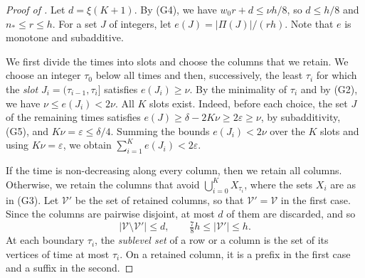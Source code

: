 \documentclass[fontsize=12pt,leading=14pt]{fullpaper}
\newcommand{\Vcal}{\mathcal{V}}
\newcommand{\eps}{\varepsilon}
\begin{document}
\begin{proof}[Proof of ]
  Let $d=\xi(K+1)$.
  By (G4), we have $w_0r+d\le\nu h/8$, so $d\le h/8$ and $n_*\le r\le h$.
  For a set $J$ of integers, let $e(J)=|\Pi(J)|/(rh)$.
  Note that $e$ is monotone and subadditive.

  We first divide the times into slots and choose the columns that we retain.
  We choose an integer $\tau_0$ below all times and then, successively, the least $\tau_i$ for which the \emph{slot} $J_i=(\tau_{i-1},\tau_i]$ satisfies $e(J_i)\ge\nu$.
  By the minimality of $\tau_i$ and by (G2), we have $\nu\le e(J_i)<2\nu$.
  All $K$ slots exist.
  Indeed, before each choice, the set $J$ of the remaining times satisfies $e(J)\ge\delta-2K\nu\ge2\eps\ge\nu$, by subadditivity, (G5), and $K\nu=\eps\le\delta/4$.
  Summing the bounds $e(J_i)<2\nu$ over the $K$ slots and using $K\nu=\eps$, we obtain $\sum_{i=1}^K e(J_i)<2\eps$.

  If the time is non-decreasing along every column, then we retain all columns.
  Otherwise, we retain the columns that avoid $\bigcup_{i=0}^K X_{\tau_i}$, where the sets $X_i$ are as in (G3).
  Let $\Vcal'$ be the set of retained columns, so that $\Vcal'=\Vcal$ in the first case.
  Since the columns are pairwise disjoint, at most $d$ of them are discarded, and so
  \[
    |\Vcal\setminus\Vcal'|\le d,\qquad \tfrac78h\le|\Vcal'|\le h.
  \]
  At each boundary $\tau_i$, the \emph{sublevel set} of a row or a column is the set of its vertices of time at most $\tau_i$.
  On a retained column, it is a prefix in the first case and a suffix in the second.


\end{proof}
\end{document}
